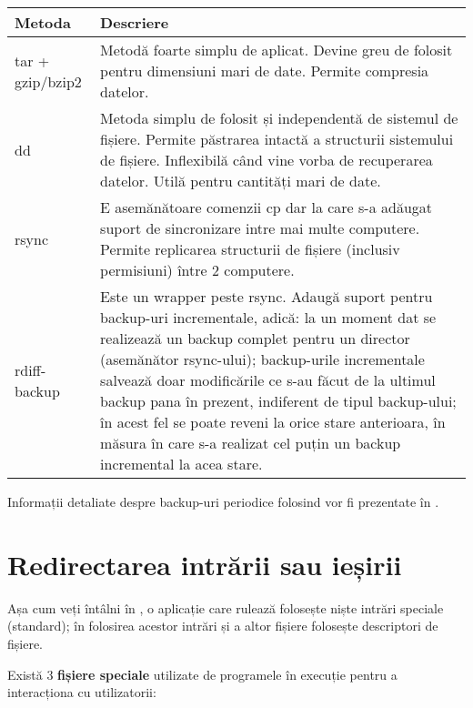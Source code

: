 \begin{table}[htb]
\begin{center}
	\begin{tabular}{ p{} p{} }
	\toprule
		\textbf{Metoda} & \textbf{Descriere} \\
	\midrule
		tar + gzip/bzip2 & Metodă foarte simplu de aplicat. Devine greu
		de folosit pentru dimensiuni mari de date. Permite compresia
		datelor. \\
	\midrule
		dd & Metoda simplu de folosit și independentă de sistemul de
		fișiere. Permite păstrarea intactă a structurii sistemului de
		fișiere. Inflexibilă când vine vorba de recuperarea datelor.
		Utilă pentru cantități mari de date. \\
	\midrule
		rsync & E asemănătoare comenzii cp dar la care s-a adăugat
		suport de sincronizare intre mai multe computere. Permite
		replicarea structurii de fișiere (inclusiv permisiuni) între 2
		computere. \\
	\midrule
		rdiff-backup & Este un wrapper peste rsync. Adaugă suport pentru
		backup-uri incrementale, adică: la un moment dat se realizează
		un backup complet pentru un director (asemănător rsync-ului);
		backup-urile incrementale salvează doar modificările ce s-au
		făcut de la ultimul backup pana în prezent, indiferent de tipul
		backup-ului; în acest fel se poate reveni la orice stare
		anterioara, în măsura în care s-a realizat cel puțin un backup
		incremental la acea stare. \\
	\bottomrule
	\end{tabular}
	\label{table:file-system-backup-cmd}
\end{center}
\end{table}

Informații detaliate despre backup-uri periodice folosind  vor fi prezentate în .

\section{Redirectarea intrării sau ieșirii}
\label{sec:file-system-redirect}

Așa cum veți întâlni în , o aplicație care rulează folosește niște intrări speciale (standard); în folosirea acestor intrări și a altor fișiere folosește descriptori de fișiere.

Există 3 \textbf{fișiere speciale} utilizate de programele în execuție pentru a
interacționa cu utilizatorii:

